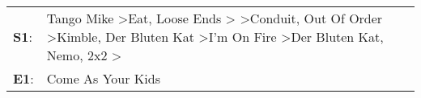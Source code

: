 \begin{supertabular}{p{0.03\textwidth}p{0.92\textwidth}}
 \textbf{S1}:  &  Tango Mike\textsuperscript{} \textgreater \enspace Eat\textsuperscript{}, \enspace Loose Ends\textsuperscript{} \textgreater {}\textsuperscript{} \textgreater \enspace Conduit\textsuperscript{}, \enspace Out Of Order\textsuperscript{} \textgreater \enspace Kimble\textsuperscript{}, \enspace Der Bluten Kat\textsuperscript{} \textgreater \enspace I'm On Fire\textsuperscript{} \textgreater \enspace Der Bluten Kat\textsuperscript{}, \enspace Nemo\textsuperscript{}, \enspace 2x2\textsuperscript{} \textgreater {}\textsuperscript{}  \enspace  \\
 \textbf{E1}:  &                                                                                                                                                                                                                                                                                                                                                                                                                                                                                                                                       Come As Your Kids\textsuperscript{}  \enspace  \\
\end{supertabular}
